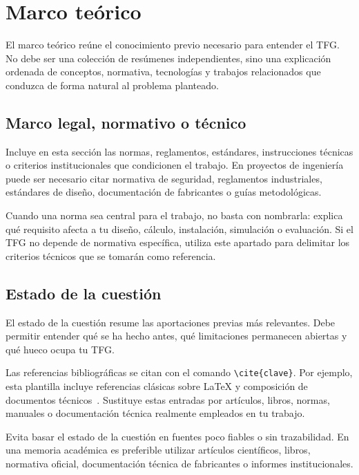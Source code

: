 \chapter{Marco teórico}
\label{cap:marco-teorico}

El marco teórico reúne el conocimiento previo necesario para entender el TFG.
No debe ser una colección de resúmenes independientes, sino una explicación
ordenada de conceptos, normativa, tecnologías y trabajos relacionados que
conduzca de forma natural al problema planteado.

\section{Marco legal, normativo o técnico}
\label{sec:marco-normativo}

Incluye en esta sección las normas, reglamentos, estándares, instrucciones
técnicas o criterios institucionales que condicionen el trabajo. En proyectos de
ingeniería puede ser necesario citar normativa de seguridad, reglamentos
industriales, estándares de diseño, documentación de fabricantes o guías
metodológicas.

Cuando una norma sea central para el trabajo, no basta con nombrarla: explica
qué requisito afecta a tu diseño, cálculo, instalación, simulación o evaluación.
Si el TFG no depende de normativa específica, utiliza este apartado para
delimitar los criterios técnicos que se tomarán como referencia.

\section{Estado de la cuestión}
\label{sec:estado-cuestion}

El estado de la cuestión resume las aportaciones previas más relevantes. Debe
permitir entender qué se ha hecho antes, qué limitaciones permanecen abiertas y
qué hueco ocupa tu TFG.

Las referencias bibliográficas se citan con el comando
\texttt{\textbackslash cite\{clave\}}. Por ejemplo, esta plantilla incluye
referencias clásicas sobre \LaTeX{} y composición de documentos
técnicos~\cite{lamport1994latex,mittelbach2004latex}. Sustituye estas entradas por
artículos, libros, normas, manuales o documentación técnica realmente empleados
en tu trabajo.

Evita basar el estado de la cuestión en fuentes poco fiables o sin trazabilidad.
En una memoria académica es preferible utilizar artículos científicos, libros,
normativa oficial, documentación técnica de fabricantes o informes
institucionales.


